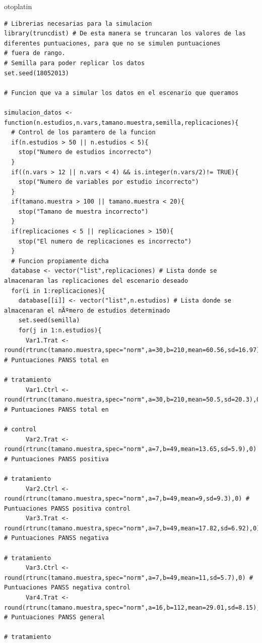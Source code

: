 otoplatin\documentclass[a4paper,openright,12pt]{report}
\begin{document}
{\begin{verbatim}
# Librerias necesarias para la simulacion
library(truncdist) # De esta manera se truncaran los valores de las diferentes puntuaciones, para que no se simulen puntuaciones
# fuera de rango.
# Semilla para poder replicar los datos
set.seed(18052013)

# Funcion que va a simular los datos en el escenario que queramos

simulacion_datos <- function(n.estudios,n.vars,tamano.muestra,semilla,replicaciones){
  # Control de los paramtero de la funcion
  if(n.estudios > 50 || n.estudios < 5){
    stop("Numero de estudios incorrecto")
  }
  if((n.vars > 12 || n.vars < 4) && is.integer(n.vars/2)!= TRUE){
    stop("Numero de variables por estudio incorrecto")
  }
  if(tamano.muestra > 100 || tamano.muestra < 20){
    stop("Tamano de muestra incorrecto")
  }
  if(replicaciones < 5 || replicaciones > 150){
    stop("El numero de replicaciones es incorrecto")
  }
  # Funcion propiamente dicha
  database <- vector("list",replicaciones) # Lista donde se almacenaran las replicaciones del escenario deseado
  for(i in 1:replicaciones){
    database[[i]] <- vector("list",n.estudios) # Lista donde se almacenaran el nÃºmero de estudios determinado
    set.seed(semilla)
    for(j in 1:n.estudios){
      Var1.Trat <- round(rtrunc(tamano.muestra,spec="norm",a=30,b=210,mean=60.56,sd=16.97),0) # Puntuaciones PANSS total en 
                                                                                              # tratamiento
      Var1.Ctrl <- round(rtrunc(tamano.muestra,spec="norm",a=30,b=210,mean=50.5,sd=20.3),0) # Puntuaciones PANSS total en 
                                                                                            # control
      Var2.Trat <- round(rtrunc(tamano.muestra,spec="norm",a=7,b=49,mean=13.65,sd=5.9),0) # Puntuaciones PANSS positiva 
                                                                                          # tratamiento
      Var2.Ctrl <- round(rtrunc(tamano.muestra,spec="norm",a=7,b=49,mean=9,sd=9.3),0) # Puntuaciones PANSS positiva control
      Var3.Trat <- round(rtrunc(tamano.muestra,spec="norm",a=7,b=49,mean=17.82,sd=6.92),0) # Puntuaciones PANSS negativa 
                                                                                           # tratamiento
      Var3.Ctrl <- round(rtrunc(tamano.muestra,spec="norm",a=7,b=49,mean=11,sd=5.7),0) # Puntuaciones PANSS negativa control
      Var4.Trat <- round(rtrunc(tamano.muestra,spec="norm",a=16,b=112,mean=29.01,sd=8.15),0) # Puntuaciones PANSS general 
                                                                                             # tratamiento

\end{verbatim}}
\end{document}
